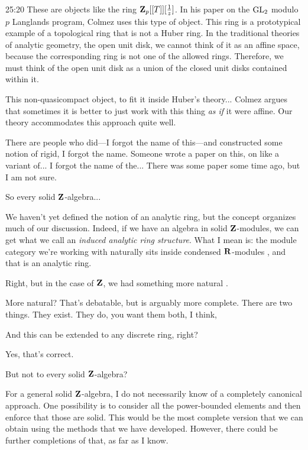 \begin{unfinished}{25:20}
These are objects like the ring $\mathbf Z_p[[T]][\frac{1}{z}]$. In his paper on the $\operatorname{GL}_2$ modulo $p$ Langlands program, Colmez uses this type of object. This ring is a prototypical example of a topological ring that is not a Huber ring. In the traditional theories of analytic geometry, the open unit disk, we cannot think of it as an affine space, because the corresponding ring is not one of the allowed rings. Therefore, we must think of the open unit disk as a union of the closed unit disks contained within it.

This non-quasicompact object, to fit it inside Huber's theory... 
Colmez argues that sometimes it is better to just work with this thing \emph{as if} it were affine. Our theory accommodates this approach quite well.

\gabber There are people who did---I forgot the name of this---and constructed some notion of rigid, I forgot the name. Someone wrote a paper on this, on like a variant of... I forgot the name of the... There was some paper some time ago, but I am not sure.

\ques So every solid $\mathbf Z$-algebra...

\ans We haven't yet defined the notion of an analytic ring, but the concept organizes much of our discussion. Indeed, if we have an algebra in solid $\mathbf Z$-modules, we can get what we call an \emph{induced analytic ring structure}. What I mean is: the module category we're working with naturally sits inside condensed $\mathbf R$-modules , and that is an analytic ring. 

\ques Right, but in the case of $\mathbf Z$, we had something more natural .

\ans More natural? That's debatable, but is arguably more complete. There are two things. They exist. They do, you want them both, I think, 

\ques And this can be extended to any discrete ring, right?

\ans Yes, that's correct. 

\ques But not to every solid $\mathbf Z$-algebra? 

\ans For a general solid $\mathbf Z$-algebra, I do not necessarily know of a completely canonical approach. One possibility is to consider all the power-bounded elements and then enforce that those are solid. This would be the most complete version that we can obtain using the methods that we have developed. However, there could be further completions of that, as far as I know.


\end{unfinished}
